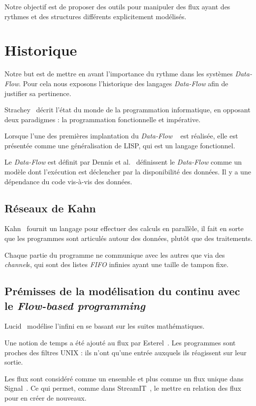 \documentclass{llncs}
\newcommand{\DF}{\emph{Data-Flow} }
\newcommand{\DFp}{\emph{Data-Flow}. }
\newcommand{\FB}{\emph{Flow-based programming} }
\begin{document}
Notre objectif est de proposer des outils pour manipuler des flux ayant des
rythmes et des structures différents explicitement modélisés.

\section{Historique}
Notre but est de mettre en avant l'importance du rythme dans les systèmes \DFp
Pour cela nous exposons l'historique des langages \DF afin de justifier sa
pertinence.

Strachey~\cite{Strachey73} décrit l'état du monde de la programmation
informatique, en opposant deux paradigmes : la programmation fonctionnelle et impérative.

Lorsque l'une des premières implantation du \DF~\cite{Dennis72} est réalisée, elle
est présentée comme une généralisation de LISP, qui est un langage fonctionnel.

Le \DF est définit par Dennis et al.~\cite{Dennis72} définissent le \DF comme un modèle dont l'exécution
est déclencher par la disponibilité des données.
Il y a une dépendance du code vis-à-vis des données.

\subsection{Réseaux de Kahn}
Kahn~\cite{Kahn74} fournit un langage pour effectuer des calculs en parallèle,
il fait en sorte que les programmes sont articulés autour des données, plutôt que
des traitements.

Chaque partie du programme ne communique avec les autres que via des
\emph{channel}s, qui sont des listes \emph{FIFO} infinies ayant une taille de
tampon fixe.

\subsection{Prémisses de la modélisation du continu avec le \FB}
Lucid~\cite{AshcroftW76} modélise l'infini en se basant sur les suites mathématiques.

Une notion de temps a été ajouté au flux par Esterel~\cite{Berry84}.
Les programmes sont proches des filtres UNIX : ils n'ont qu'une entrée auxquels
ils réagissent sur leur sortie.

Les flux sont considéré comme un ensemble et plus comme un flux unique dans Signal~\cite{Benveniste85}.
Ce qui permet, comme dans StreamIT~\cite{Thies02}, le mettre en relation des flux
pour en créer de nouveaux.
\end{document}
